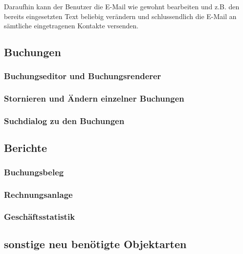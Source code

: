 Daraufhin kann der Benutzer die E-Mail wie gewohnt bearbeiten und z.B. den bereits eingesetzten Text beliebig verändern und schlussendlich die E-Mail an sämtliche eingetragenen Kontakte versenden.


\subsection{Buchungen}
\subsubsection{Buchungseditor und Buchungsrenderer}
\subsubsection{Stornieren und Ändern einzelner Buchungen}
\subsubsection{Suchdialog zu den Buchungen}

\subsection{Berichte}
\subsubsection{Buchungsbeleg}
\subsubsection{Rechnungsanlage}
\subsubsection{Geschäftsstatistik}

\subsection{sonstige neu benötigte Objektarten}



